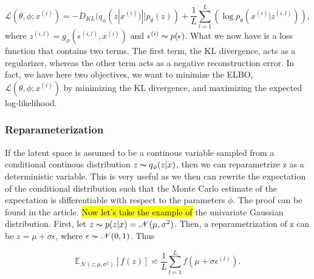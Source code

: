 \begin{equation}
    \mathcal{L}(\theta, \phi; x^{(i)}) = -D_{KL}(q_{\phi}(z|x^{(i)})||p_{\theta}(z)) + \frac{1}{L}\sum_{l=1}^{L} (\log p_{\theta}(x^{(i)}|z^{(i,l)})),
\end{equation}
where $z^{(i,l)} = g_{\phi}(\epsilon^{(i,l)}, x^{(i)})$ and $\epsilon^{(i)} \thicksim p(\epsilon)$. What we now have is a loss function that contains two terms. 
The first term, the KL divergence, acts as a regularizer, whereas the other term acts as a negative reconstruction error. In fact, we have here two objectives, 
we want to minimize the ELBO, $\mathcal{L}(\theta, \phi; x^{(i)})$ by minimizing the KL divergence, and maximizing the expected log-likelihood. 

\subsubsection*{Reparameterization}\label{sec:reparameterization}
If the latent space is assumed to be a continous variable sampled from a conditional continous distribution 
$z \thicksim q_{\phi}(z|x)$, then we can reparametrize z as a deterministic variable. This is very useful as 
we then can rewrite the expectation of the conditional distribution such that the Monte Carlo estimate of 
the expectation is differentiable with respect to the parameters $\phi$. The proof can be found in the article\cite{VAE}.  
\hl{Now let's take the example of} the univariate Gaussian distribution. First, let $z \thicksim p(z|x) = \mathcal{N}(\mu, \sigma^2)$. 
Then, a reparametrization of z can be $z = \mu + \sigma\epsilon$, where $\epsilon \thicksim \mathcal{N}(0,1)$. 
Thus 

\begin{equation*}
    \mathbb{E}_{\mathcal{N}(z; \mu, \sigma^2)}[f(z)] \backsimeq  \frac{1}{L}\sum_{l=1}^L f(\mu + \sigma\epsilon^{(l)}).
\end{equation*}

